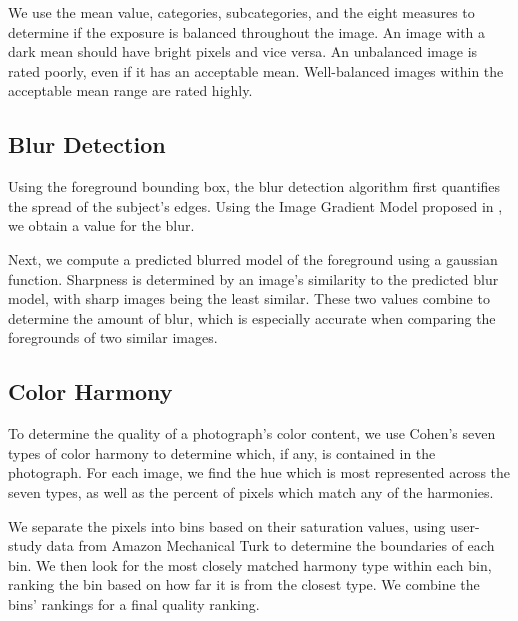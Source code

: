 \documentclass{article}
\begin{document}
We use the mean value, categories, subcategories, and the eight measures to determine if the exposure is balanced throughout the image. An image with a dark mean should have bright pixels and vice versa. An unbalanced image is rated poorly, even if it has an acceptable mean. Well-balanced images within the acceptable mean range are rated highly.


\subsection{Blur Detection}
Using the foreground bounding box, the blur detection algorithm first quantifies the spread of the subject's edges. Using the Image Gradient Model proposed in \cite{springerlink:10.1007/978-3-540-77409-9_26}, we obtain a value for the blur.

Next, we compute a predicted blurred model of the foreground using a gaussian function. Sharpness is determined by an image's similarity to the predicted blur model, with sharp images being the least similar. These two values combine to determine the amount of blur, which is especially accurate when comparing the foregrounds of two similar images.


\subsection{Color Harmony}

To determine the quality of a photograph's color content, we use Cohen's seven types of color harmony\cite{Cohen-Or:2006:CH:1179352.1141933} to determine which, if any, is contained in the photograph. For each image, we find the hue which is most represented across the seven types, as well as the percent of pixels which match any of the harmonies.

We separate the pixels into bins based on their saturation values, using user-study data from Amazon Mechanical Turk to determine the boundaries of each bin. We then look for the most closely matched harmony type within each bin, ranking the bin based on how far it is from the closest type. We combine the bins' rankings for a final quality ranking.

\end{document}
